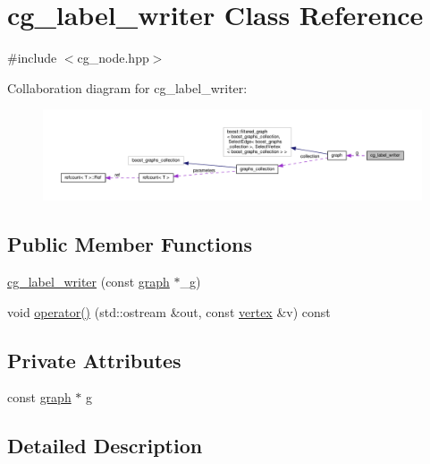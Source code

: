 \hypertarget{classcg__label__writer}{}\section{cg\+\_\+label\+\_\+writer Class Reference}
\label{classcg__label__writer}


{\ttfamily \#include $<$cg\+\_\+node.\+hpp$>$}



Collaboration diagram for cg\+\_\+label\+\_\+writer\+:
\nopagebreak
\begin{figure}[H]
\begin{center}
\leavevmode
\includegraphics[width=350pt]{d6/de3/classcg__label__writer__coll__graph}
\end{center}
\end{figure}
\subsection*{Public Member Functions}
\begin{DoxyCompactItemize}
\item 
\hyperlink{classcg__label__writer_a59d101c21438fb58a0161d030f2bfc73}{cg\+\_\+label\+\_\+writer} (const \hyperlink{structgraph}{graph} $\ast$\+\_\+g)
\item 
void \hyperlink{classcg__label__writer_aa4a9dd85202a53c3565f52de30877b56}{operator()} (std\+::ostream \&out, const \hyperlink{graph_8hpp_abefdcf0544e601805af44eca032cca14}{vertex} \&v) const
\end{DoxyCompactItemize}
\subsection*{Private Attributes}
\begin{DoxyCompactItemize}
\item 
const \hyperlink{structgraph}{graph} $\ast$ \hyperlink{classcg__label__writer_ace4a7f6afc10a312282534f0f3c4005f}{g}
\end{DoxyCompactItemize}


\subsection{Detailed Description}


